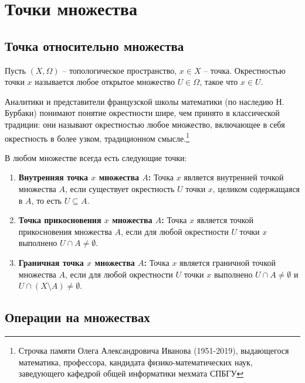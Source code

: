 \section{Точки множества}

\subsection{Точка относительно множества}

\begin{definition}
	Пусть \((X, \Omega)\) -- топологическое пространство, \(x \in X\) -- точка. Окрестностью точки \(x\) называется любое открытое множество \(U \in \Omega\), такое что \(x \in U\).
\end{definition}

Аналитики и представители французской школы математики (по наследию Н. Бурбаки) понимают понятие окрестности шире, чем принято в классической традиции: они называют окрестностью любое множество, включающее в себя окрестность в более узком, традиционном смысле.\footnote{Строчка памяти Олега Александровича Иванова (1951-2019), выдающегося математика, профессора, кандидата физико-математических наук, заведующего кафедрой общей информатики мехмата СПБГУ}
\begin{definition}
	В любом множестве всегда есть следующие точки:
	\begin{enumerate}
		\item \textbf{Внутренняя точка \(x\) множества \(A\):} Точка \(x\) является внутренней точкой множества \(A\), если существует окрестность \(U\) точки \(x\), целиком содержащаяся в \(A\), то есть \(U \subseteq A\).
		
		\item \textbf{Точка прикосновения \(x\) множества \(A\):} Точка \(x\) является точкой прикосновения множества \(A\), если для любой окрестности \(U\) точки \(x\) выполнено \(U \cap A \neq \emptyset\).
		
		\item \textbf{Граничная точка \(x\) множества \(A\):} Точка \(x\) является граничной точкой множества \(A\), если для любой окрестности \(U\) точки \(x\) выполнено \(U \cap A \neq \emptyset\) и \(U \cap (X \setminus A) \neq \emptyset\).
	\end{enumerate}
\end{definition}

\subsection{Операции на множествах}

